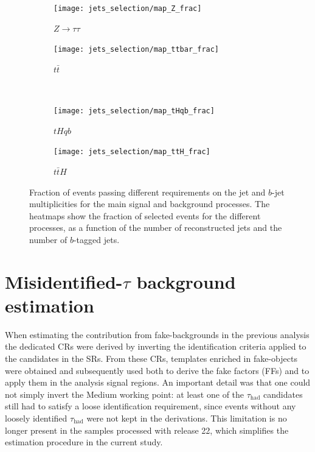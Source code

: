 \begin{figure}[htbp]
    \centering
    \begin{subfigure}[b]{0.48\textwidth}
      \centering
      \texttt{[image: jets\_selection/map\_Z\_frac]}
      \caption{$Z\to\tau\tau$}
      \label{fig:jetsel_ztt}
    \end{subfigure}
    \hfill
    \begin{subfigure}[b]{0.48\textwidth}
      \centering
      \texttt{[image: jets\_selection/map\_ttbar\_frac]}
      \caption{$t\bar{t}$}
      \label{fig:jetsel_ttbar}
    \end{subfigure}
    \\[0.3cm]
    \begin{subfigure}[b]{0.48\textwidth}
      \centering
      \texttt{[image: jets\_selection/map\_tHqb\_frac]}
      \caption{$tHqb$}
      \label{fig:jetsel_th}
    \end{subfigure}
    \hfill
    \begin{subfigure}[b]{0.48\textwidth}
      \centering
      \texttt{[image: jets\_selection/map\_ttH\_frac]}
      \caption{$t\bar{t}H$}
      \label{fig:jetsel_tth}
    \end{subfigure}
    \caption{
      Fraction of events passing different requirements on the jet and $b$-jet multiplicities
      for the main signal and background processes. 
      The heatmaps show the fraction of selected events for the different processes, 
      as a function of the number of reconstructed jets and the number of $b$-tagged jets.
    }
    \label{jets_selection}
  \end{figure}
  
\section{Misidentified-$\tau$ background estimation}
\label{fakes_run3}

When estimating the contribution from fake-\tauhad backgrounds in the previous analysis the dedicated CRs were derived by inverting the identification criteria applied to the \tauhad candidates in the SRs. From these CRs, templates enriched in fake-\tauhad objects were obtained and subsequently used both to derive the fake factors (FFs) and to apply them in the analysis signal regions. An important detail was that one could not simply invert the Medium working point: at least one of the $\tau_{\mathrm{had}}$ candidates still had to satisfy a loose identification requirement, since events without any loosely identified $\tau_{\mathrm{had}}$ were not kept in the derivations. This limitation is no longer present in the samples processed with release 22, which simplifies the estimation procedure in the current study.


